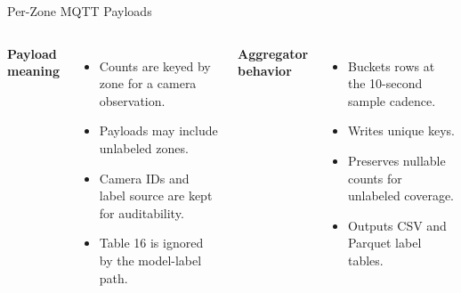 \documentclass[aspectratio=169]{beamer}
\begin{document}
\begin{frame}[shrink=4]{Per-Zone MQTT Payloads}
\begin{columns}[T,onlytextwidth]
\textbf{Payload meaning}
\begin{itemize}
  \item Counts are keyed by zone for a camera observation.
  \item Payloads may include unlabeled zones.
  \item Camera IDs and label source are kept for auditability.
  \item Table 16 is ignored by the model-label path.
\end{itemize}

\textbf{Aggregator behavior}
\begin{itemize}
  \item Buckets rows at the 10-second sample cadence.
  \item Writes unique  keys.
  \item Preserves nullable counts for unlabeled coverage.
  \item Outputs CSV and Parquet label tables.
\end{itemize}
\end{columns}
\tightsep
\begin{center}
\hspace{0.45em}
\hspace{0.45em}
\hspace{0.45em}
\end{center}
\end{frame}
\end{document}
